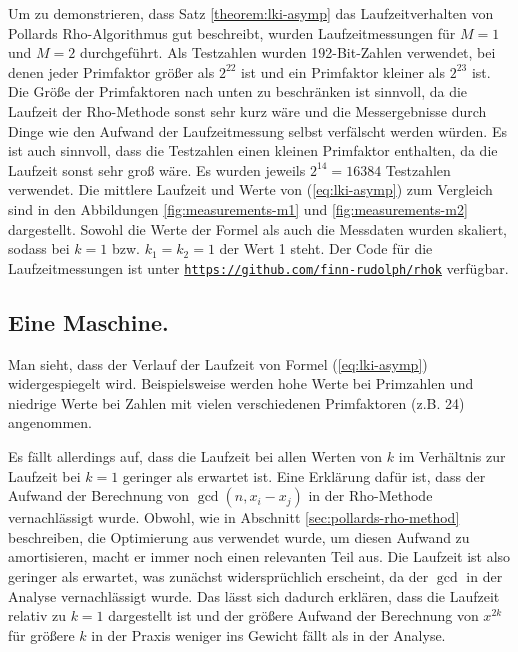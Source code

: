 \documentclass[a4paper, 11pt, ngerman]{article}
\theoremstyle{definition}
\theoremstyle{plain}
\theoremstyle{remark}
\begin{document}
Um zu demonstrieren, dass Satz \ref{theorem:lki-asymp} das Laufzeitverhalten von Pollards Rho-Algorithmus gut beschreibt, wurden Laufzeitmessungen für $M = 1$ und $M = 2$ durchgeführt. Als Testzahlen wurden 192-Bit-Zahlen verwendet, bei denen jeder Primfaktor größer als $2^{22}$ ist und ein Primfaktor kleiner als $2^{23}$ ist. Die Größe der Primfaktoren nach unten zu beschränken ist sinnvoll, da die Laufzeit der Rho-Methode sonst sehr kurz wäre und die Messergebnisse durch Dinge wie den Aufwand der Laufzeitmessung selbst verfälscht werden würden. Es ist auch sinnvoll, dass die Testzahlen einen kleinen Primfaktor enthalten, da die Laufzeit sonst sehr groß wäre. Es wurden jeweils $2^{14} = 16384$ Testzahlen verwendet. Die mittlere Laufzeit und Werte von (\ref{eq:lki-asymp}) zum Vergleich sind in den Abbildungen \ref{fig:measurements-m1} und \ref{fig:measurements-m2} dargestellt. Sowohl die Werte der Formel als auch die Messdaten wurden skaliert, sodass bei $k = 1$ bzw. $k_1 = k_2 = 1$ der Wert 1 steht. Der Code für die Laufzeitmessungen ist unter \href{https://github.com/finn-rudolph/rhok}{\texttt{https://github.com/finn-rudolph/rhok}} verfügbar.

\subsection{Eine Maschine.}

Man sieht, dass der Verlauf der Laufzeit von Formel (\ref{eq:lki-asymp}) widergespiegelt wird. Beispielsweise werden hohe Werte bei Primzahlen und niedrige Werte bei Zahlen mit vielen verschiedenen Primfaktoren (z.B. 24) angenommen.

Es fällt allerdings auf, dass die Laufzeit bei allen Werten von $k$ im Verhältnis zur Laufzeit bei $k = 1$ geringer als erwartet ist. Eine Erklärung dafür ist, dass der Aufwand der Berechnung von $\gcd(n, x_i - x_j)$ in der Rho-Methode vernachlässigt wurde. Obwohl, wie in Abschnitt \ref{sec:pollards-rho-method} beschreiben, die Optimierung aus \cite{bre80} verwendet wurde, um diesen Aufwand zu amortisieren, macht er immer noch einen relevanten Teil aus. Die Laufzeit ist also geringer als erwartet, was zunächst widersprüchlich erscheint, da der $\gcd$ in der Analyse vernachlässigt wurde. Das lässt sich dadurch erklären, dass die Laufzeit relativ zu $k = 1$ dargestellt ist und der größere Aufwand der Berechnung von $x^{2k}$ für größere $k$ in der Praxis weniger ins Gewicht fällt als in der Analyse.
\end{document}
